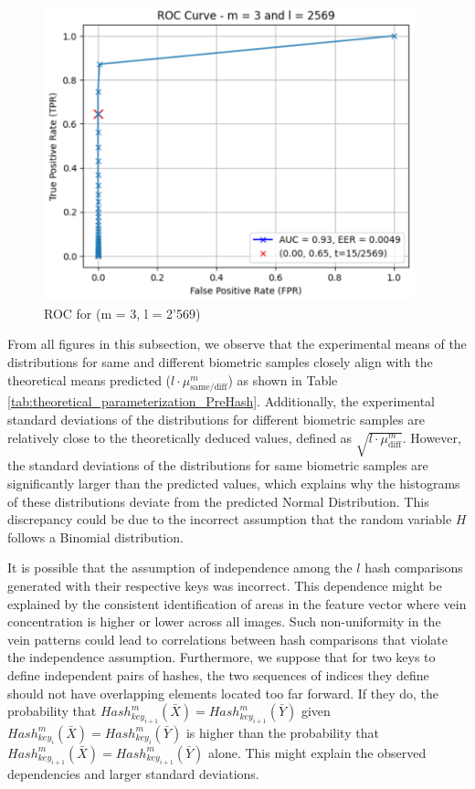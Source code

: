 \begin{enumerate}
\begin{itemize}
            \begin{figure}[H]
                    \centering
                    \includegraphics[width=\linewidth,height=8.5cm,keepaspectratio]{latex-img/FNR-FPR_ROC_TPR_config3.png}
                    \caption{ROC for (m = 3, l = 2'569)}
                    \label{FNR-FPR_ROC_TPR_config3}
            \end{figure}
        \end{itemize}
\end{enumerate}
\newpage
From all figures in this subsection, we observe that the experimental means of the distributions for same and different biometric samples closely align with the theoretical means predicted (\(l\cdot\mu_{\text{same/diff}}^m\)) as shown in Table \ref{tab:theoretical_parameterization_PreHash}. Additionally, the experimental standard deviations of the distributions for different biometric samples are relatively close to the theoretically deduced values, defined as \(\sqrt{l\cdot\mu_{\text{diff}}^m}\). However, the standard deviations of the distributions for same biometric samples are significantly larger than the predicted values, which explains why the histograms of these distributions deviate from the predicted Normal Distribution. This discrepancy could be due to the incorrect assumption that the random variable \(H\) follows a Binomial distribution. 

It is possible that the assumption of independence among the \(l\) hash comparisons generated with their respective keys was incorrect. This dependence might be explained by the consistent identification of areas in the feature vector where vein concentration is higher or lower across all images. Such non-uniformity in the vein patterns could lead to correlations between hash comparisons that violate the independence assumption. Furthermore, we suppose that for two keys to define independent pairs of hashes, the two sequences of indices they define should not have overlapping elements located too far forward. If they do, the probability that \( Hash_{key_{i+1}}^m(\bar{X}) = Hash_{key_{i+1}}^m(\bar{Y}) \) given \( Hash_{key_{i}}^m(\bar{X}) = Hash_{key_{i}}^m(\bar{Y}) \) is higher than the probability that \( Hash_{key_{i+1}}^m(\bar{X}) = Hash_{key_{i+1}}^m(\bar{Y}) \)
alone. This might explain the observed dependencies and larger standard deviations.

